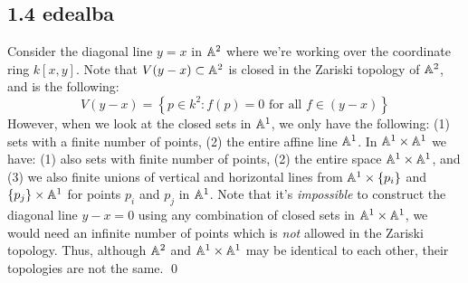 \subsection*{1.4   {edealba}}

  Consider the diagonal line $y=x$ in $\mathbb{A}^2$ where we're working over the coordinate ring $k[x, y]$. Note that $V(y-x) \subset \mathbb{A}^2$ is closed in the Zariski topology of $\mathbb{A}^2$, and is the following:
$$ V(y-x) = \left\{ p \in k^2 : f(p) = 0 \text{ for all } f \in (y-x) \right\} $$
However, when we look at the closed sets in $\mathbb{A}^1$, we only have the following: (1) sets with a finite number of points, (2) the entire affine line $\mathbb{A}^1$. In $\mathbb{A}^1 \times \mathbb{A}^1$ we have: (1) also sets with finite number of points, (2) the entire space $\mathbb{A}^1 \times \mathbb{A}^1$, and (3) we also finite unions of vertical and horizontal lines from $\mathbb{A}^1 \times \{ p_i \}$ and $\{ p_j \} \times \mathbb{A}^1$ for points $p_i$ and $p_j$ in $\mathbb{A}^1$. Note that it's \emph{impossible} to construct the diagonal line $y-x=0$ using any combination of closed sets in $\mathbb{A}^1 \times \mathbb{A}^1$, we would need an infinite number of points which is \emph{not} allowed in the Zariski topology. Thus, although $\mathbb{A}^2$ and $\mathbb{A}^1 \times \mathbb{A}^1$ may be identical to each other, their topologies are not the same. \qed

